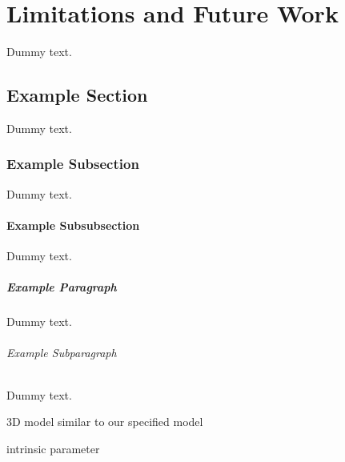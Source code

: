 \chapter{Limitations and Future Work}

Dummy text.

\section{Example Section}

Dummy text.

\subsection{Example Subsection}

Dummy text.

\subsubsection{Example Subsubsection}

Dummy text.

\paragraph{Example Paragraph}

Dummy text.

\subparagraph{Example Subparagraph}

Dummy text.


3D model similar to our specified model

 intrinsic parameter
